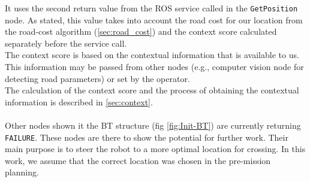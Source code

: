         It uses the second return value from the ROS service called in the \texttt{GetPosition} node. As stated, this value takes into account the road cost for our location from the road-cost algorithm (\ref{sec:road_cost}) and the context score calculated separately before the service call.\\
        The context score is based on the contextual information that is available to us. This information may be passed from other nodes (e.g., computer vision node for detecting road parameters) or set by the operator.\\
        The calculation of the context score and the process of obtaining the contextual information is described in \ref{sec:context}.\\\\

    \noindent Other nodes shown it the BT structure (fig \ref{fig:Init-BT}) are currently returning \texttt{FAILURE}. These nodes are there to show the potential for further work. Their main purpose is to steer the robot to a more optimal location for crossing. In this work, we assume that the correct location was chosen in the pre-mission planning.